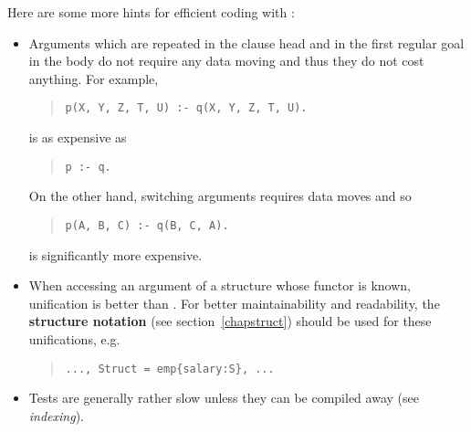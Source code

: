 Here are some more hints for efficient coding with {\eclipse}:
\begin{itemize}

\item Arguments which are repeated in the clause head and in the first
regular goal in the body do not require any data moving and thus
they do not cost anything. For example,
\begin{quote}
\begin{verbatim}
p(X, Y, Z, T, U) :- q(X, Y, Z, T, U).
\end{verbatim}
\end{quote}
is as expensive as
\begin{quote}
\begin{verbatim}
p :- q.
\end{verbatim}
\end{quote}
On the other hand, switching arguments requires data moves and so
\begin{quote}
\begin{verbatim}
p(A, B, C) :- q(B, C, A).
\end{verbatim}
\end{quote}
is significantly more expensive.

\item When accessing an argument of a
structure whose functor is known, unification
is better than .
For better maintainability and readability, the {\bf structure
notation} (see section~\ref{chapstruct})
should be used for these unifications, e.g.
\begin{quote}
\begin{verbatim}
..., Struct = emp{salary:S}, ...
\end{verbatim}
\end{quote}

\item Tests are generally rather slow unless they can be compiled away
(see {\it indexing}).



\end{itemize}
